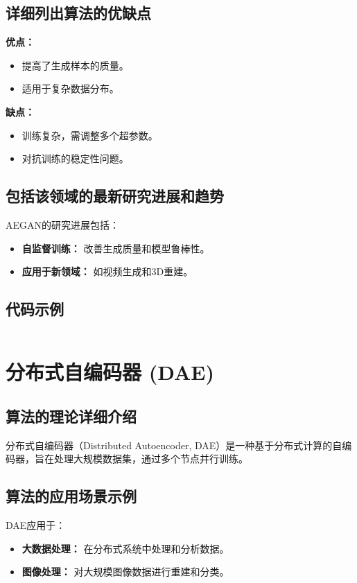 \subsection*{详细列出算法的优缺点}
\textbf{优点：}
\begin{itemize}
    \item 提高了生成样本的质量。
    \item 适用于复杂数据分布。
\end{itemize}

\textbf{缺点：}
\begin{itemize}
    \item 训练复杂，需调整多个超参数。
    \item 对抗训练的稳定性问题。
\end{itemize}

\subsection*{包括该领域的最新研究进展和趋势}
AEGAN的研究进展包括：
\begin{itemize}
    \item \textbf{自监督训练：} 改善生成质量和模型鲁棒性。
    \item \textbf{应用于新领域：} 如视频生成和3D重建。
\end{itemize}
\subsection*{代码示例}
\begin{lstlisting}

\end{lstlisting}


\section{分布式自编码器 (DAE)}
\subsection*{算法的理论详细介绍}
分布式自编码器（Distributed Autoencoder, DAE）是一种基于分布式计算的自编码器，旨在处理大规模数据集，通过多个节点并行训练。

\subsection*{算法的应用场景示例}
DAE应用于：
\begin{itemize}
    \item \textbf{大数据处理：} 在分布式系统中处理和分析数据。
    \item \textbf{图像处理：} 对大规模图像数据进行重建和分类。
\end{itemize}

